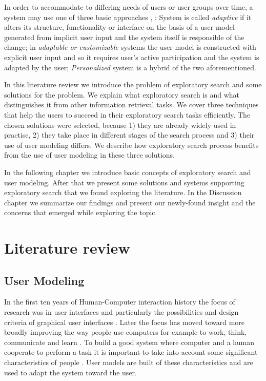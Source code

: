 \documentclass{sigchi}
\begin{document}
In order to accommodate to differing needs of users or user groups over time, a system may use one of three basic approaches \cite{van08},\cite{findlater04} : System is called \textit{adaptive} if it alters its structure, functionality or interface on the basis of a user model generated from implicit user input and the system itself is responsible of the change; in \textit{adaptable or customizable} systems the user model is constructed with explicit user input and so it requires user's active participation and the system is adapted by the user; \textit{Personalized} system is a hybrid of the two aforementioned.

In this literature review we introduce the problem of exploratory search and some solutions for the problem.
We explain what exploratory search is and what distinguishes it from other information retrieval tasks.
We cover three techniques that help the users to succeed in their exploratory search tasks efficiently.
The chosen solutions were selected, because 1) they are already widely used in practise, 2) they take place in different stages of the search process and 3) their use of user modeling differs.
We describe how exploratory search process benefits from the use of user modeling in these three solutions.

In the following chapter we introduce basic concepts of exploratory search and user modeling.
After that we present some solutions and systems supporting exploratory search that we found exploring the literature.
In the Discussion chapter we summarize our findings and present our newly-found insight and the concerns that emerged while exploring the topic.

\section{Literature review}
\label{sec:litreview}



\subsection{User Modeling}

In the first ten years of Human-Computer interaction history the focus of research was in user interfaces and particularly the possibilities and design criteria of graphical user interfaces \cite{fischer01}. Later the focus has moved toward more broadly improving the way people use computers for example to work, think, communicate and learn \cite{fischer01}. To build a good system where computer and a human cooperate to perform a task it is important to take into account some significant characteristics of people \cite{rich99}. User models are built of these characteristics and are used to adapt the system toward the user.
\end{document}
